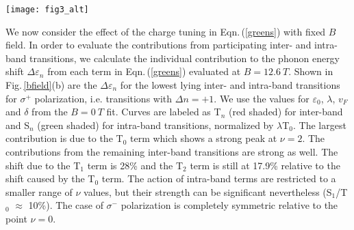 \documentclass[prl,aps,superscriptaddress,showpacs,reprint]{revtex4-1}
\begin{document}
\begin{figure*}
\texttt{[image: fig3\_alt]}
\caption{\label{bfield} a) Schematic view of the Landau level spectrum at $B=12.6\: T$, filling factor $\nu=2$ and the lowest Landau level transitions participating in magneto-phonon coupling. Filled electronic states are highlighted using orange color. Red and blue arrows show transitions allowed by the selection rule $\Delta\left|n\right|= \pm 1$. Dashed arrows mark Pauli blocked transitions. Circular arrows represent the angular momentum involved in the transitions b) Relative strength and filling factor dependence of individual terms of the phonon self energy for $\sigma^+$-transitions. Terms describing interband transitions are shaded red, intraband transitions are shaded green.  c) Phonon energy as a function of the filling factor at $B=12.6\: T$. Vertical orange lines mark specific filling factors at $\nu=-6,-2,0,2,6$ where the n=-1,0,1 levels are completely filled/depleted with charge carriers ($\nu=0$ corresponds to half filling of $n$=$0$ level). The calculated magneto-phonon energies according to Eqn.\,(\ref{greens}) are plotted as solid red($\Delta n = +1$) and solid blue($\Delta n = -1$) lines. Light grey points are due to a weak asymmetry in the peak visible for  low intensity (see supplementary material).}
\end{figure*}

We now consider the effect of the charge tuning in Eqn.\,(\ref{greens}) with fixed $B$ field. 
In order to evaluate the contributions from participating inter- and intra-band transitions, we calculate the individual contribution to the phonon energy shift $\Delta\varepsilon_n$ from each term in Eqn.\,(\ref{greens}) evaluated at $B=12.6\: T$. Shown in Fig.\,\ref{bfield}(b) are the $\Delta\varepsilon_n$ for the lowest lying inter- and intra-band transitions for $\sigma^+$ polarization, i.e. transitions with $\Delta n =+1$. We use the values for $\varepsilon_0$, $\lambda$, $v_F$ and $\delta$ from the $B=0\: T$ fit. Curves are labeled as T$_n$ (red shaded) for inter-band and S$_n$ (green shaded) for intra-band transitions, normalized by $\lambda$T$_0$. The largest contribution is due to the T$_0$ term which shows a strong peak at $\nu=2$. The contributions from the remaining inter-band transitions are strong as well. The shift due to the T$_1$ term is 28\% and the T$_2$ term is still at 17.9\% relative to the shift caused by the T$_0$ term.
The action of intra-band terms are restricted to a smaller range of $\nu$ values, but their strength can be significant nevertheless (S$_1$/T$_0$ $\approx$ 10\%). The case of $\sigma^-$ polarization is completely symmetric relative to the point $\nu = 0$.
\end{document}
